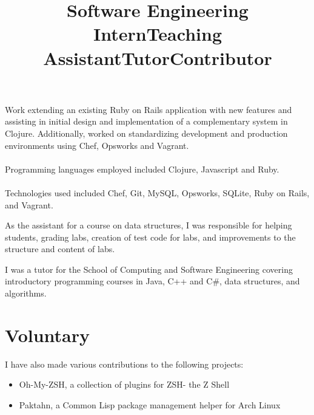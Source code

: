\documentclass[margintitle,line]{res}
\renewcommand{\subsection}[1]{\section{\normalfont #1}}
\begin{document}
\begin{resume}
\title{Software Engineering Intern}
\begin{position}
 Work extending an existing Ruby on Rails application with new
 features and assisting in initial design and implementation of a
 complementary system in  Clojure. Additionally, worked on
 standardizing development and production environments using Chef,
 Opsworks and Vagrant. \\ \ \\
 Programming languages employed included Clojure, Javascript and Ruby. \\ \ \\
 Technologies used included Chef, Git, MySQL, Opsworks, SQLite,
 Ruby on Rails, and Vagrant.
\end{position}

\title{Teaching Assistant}
\begin{position}
 As the assistant for a course on data structures, I was responsible
 for helping students, grading labs, creation of test code for labs,
 and improvements to the structure and content of labs.
\end{position}

\title{Tutor}
\begin{position}
I was a tutor for the School of Computing and Software Engineering
covering introductory programming courses in Java, C++ and C\#, data
structures, and algorithms.
\end{position}

%
\subsection{Voluntary}

\title{Contributor}
\begin{position}
I have also made various contributions to the following projects:
\begin{itemize}
\item{Oh-My-ZSH, a collection of plugins for ZSH- the Z Shell}
\item{Paktahn, a Common Lisp package management helper for Arch Linux}
\end{itemize}
\end{position}


\end{resume}
\end{document}
